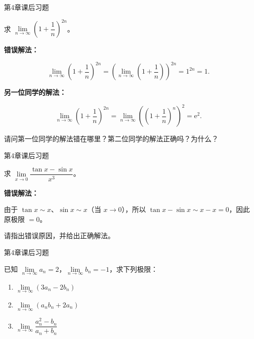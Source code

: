 \documentclass[aspectratio=169,10pt,fontset=fandol]{ctexbeamer}
\newcommand{\ee}{\mathrm{e}}
\begin{document}
\begin{frame}[t,fragile]{第4章课后习题}
\normalsize
{\normalsize


求 \(\lim\limits_{n\to\infty} \left(1 + \dfrac{1}{n}\right)^{2n}\)。



\textbf{错误解法：}

\[

\lim_{n\to\infty} \left(1 + \dfrac{1}{n}\right)^{2n} = \left(\lim_{n\to\infty} \left(1 + \dfrac{1}{n}\right)\right)^{2n} = 1 ^{2n}=1.

\]



\textbf{另一位同学的解法：}

\[

\lim_{n\to\infty} \left(1 + \dfrac{1}{n}\right)^{2n} = \lim_{n\to\infty} \left(\left(1 + \dfrac{1}{n}\right)^n\right)^2 = \ee^2.

\]



请问第一位同学的解法错在哪里？第二位同学的解法正确吗？为什么？


}
\end{frame}
\begin{frame}[t,fragile]{第4章课后习题}
\normalsize
{\normalsize


求 \(\lim\limits_{x\to 0} \dfrac{\tan x - \sin x}{x^3}\)。



\textbf{错误解法：}

由于 \(\tan x \sim x\)、\(\sin x\sim x\)（当 \(x \to 0\)），所以 \(\tan x-\sin x\sim x-x=0\)，因此原极限 \(=0\)。



请指出错误原因，并给出正确解法。


}
\end{frame}
\begin{frame}[t,fragile]{第4章课后习题}
\normalsize
{\normalsize
已知 \(\lim\limits_{n\to\infty} a_n = 2\)，\(\lim\limits_{n\to\infty} b_n = -1\)，求下列极限：

\begin{enumerate}

\item \(\lim\limits_{n\to\infty} (3a_n - 2b_n)\)

\item \(\lim\limits_{n\to\infty} (a_n b_n + 2a_n)\)

\item \(\lim\limits_{n\to\infty} \dfrac{a_n^2 - b_n}{a_n + b_n}\)

\end{enumerate}


}
\end{frame}
\end{document}
